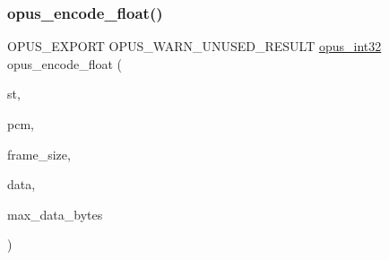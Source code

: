 \subsubsection{\texorpdfstring{opus\_encode\_float()}{opus\_encode\_float()}}
{\footnotesize\ttfamily O\+P\+U\+S\+\_\+\+E\+X\+P\+O\+RT O\+P\+U\+S\+\_\+\+W\+A\+R\+N\+\_\+\+U\+N\+U\+S\+E\+D\+\_\+\+R\+E\+S\+U\+LT \mbox{\hyperlink{opus__types_8h_aa4d309d6f80b99dbabebc8f98879ab9a}{opus\+\_\+int32}} opus\+\_\+encode\+\_\+float (\begin{DoxyParamCaption}\item[{\mbox{\hyperlink{group__opus__encoder_gaf461a3ef2f10c2fe8b994a176f06c9bd}{Opus\+Encoder}} $\ast$}]{st,  }\item[{const float $\ast$}]{pcm,  }\item[{int}]{frame\+\_\+size,  }\item[{unsigned char $\ast$}]{data,  }\item[{\mbox{\hyperlink{opus__types_8h_aa4d309d6f80b99dbabebc8f98879ab9a}{opus\+\_\+int32}}}]{max\+\_\+data\+\_\+bytes }\end{DoxyParamCaption})}

